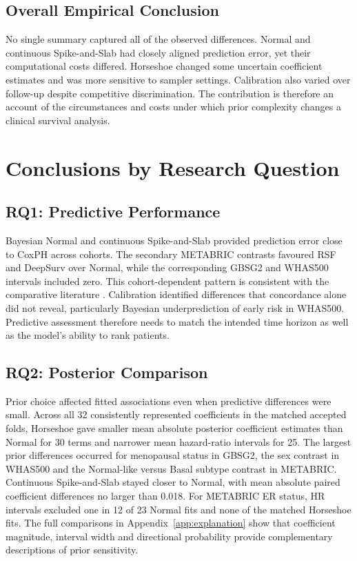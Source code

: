 \subsection{Overall Empirical Conclusion}\label{overall-empirical-conclusion}

No single summary captured all of the observed differences. Normal and continuous Spike-and-Slab had closely aligned prediction error, yet their computational costs differed. Horseshoe changed some uncertain coefficient estimates and was more sensitive to sampler settings. Calibration also varied over follow-up despite competitive discrimination. The contribution is therefore an account of the circumstances and costs under which prior complexity changes a clinical survival analysis.

\section{Conclusions by Research Question}\label{conclusion-contributions-and-future-work-1}

\subsection{RQ1: Predictive Performance}

Bayesian Normal and continuous Spike-and-Slab provided prediction error close to CoxPH across cohorts. The secondary METABRIC contrasts favoured RSF and DeepSurv over Normal, while the corresponding GBSG2 and WHAS500 intervals included zero. This cohort-dependent pattern is consistent with the comparative literature \cite{ref33,ref44}. Calibration identified differences that concordance alone did not reveal, particularly Bayesian underprediction of early risk in WHAS500. Predictive assessment therefore needs to match the intended time horizon as well as the model's ability to rank patients.

\subsection{RQ2: Posterior Comparison}

Prior choice affected fitted associations even when predictive differences were small. Across all 32 consistently represented coefficients in the matched accepted folds, Horseshoe gave smaller mean absolute posterior coefficient estimates than Normal for 30 terms and narrower mean hazard-ratio intervals for 25. The largest prior differences occurred for menopausal status in GBSG2, the sex contrast in WHAS500 and the Normal-like versus Basal subtype contrast in METABRIC. Continuous Spike-and-Slab stayed closer to Normal, with mean absolute paired coefficient differences no larger than 0.018. For METABRIC ER status, HR intervals excluded one in 12 of 23 Normal fits and none of the matched Horseshoe fits. The full comparisons in Appendix~\ref{app:explanation} show that coefficient magnitude, interval width and directional probability provide complementary descriptions of prior sensitivity.

